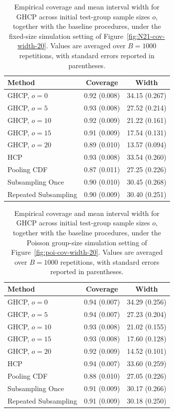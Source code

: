 
\begin{table}[t]
\centering
\caption{Empirical coverage and mean interval width for GHCP across initial test-group sample sizes $o$, together with the baseline procedures, under the fixed-size simulation setting of Figure~\ref{fig:N21-cov-width-20}. Values are averaged over $B=1000$ repetitions, with standard errors reported in parentheses.}
\label{tab:dhcp-hcp-alpha01-extra}
\small
\setlength{\tabcolsep}{6pt}
\begin{tabular}{lcc}
\toprule
Method & Coverage & Width \\
\midrule
GHCP, $o=0$  & 0.92 (0.008) & 34.15 (0.267) \\
GHCP, $o=5$  & 0.93 (0.008) & 27.52 (0.214) \\
GHCP, $o=10$  & 0.92 (0.009) & 21.22 (0.161) \\
GHCP, $o=15$  & 0.91 (0.009) & 17.54 (0.131) \\
GHCP, $o=20$  & 0.89 (0.010) & 13.57 (0.094) \\
HCP & 0.93 (0.008) & 33.54 (0.260) \\
Pooling CDF & 0.87 (0.011) & 27.25 (0.226) \\
Subsampling Once & 0.90 (0.010) & 30.45 (0.268) \\
Repeated Subsampling & 0.90 (0.009) & 30.40 (0.251) \\
\bottomrule
\end{tabular}
\end{table}

\begin{table}[t]
\centering
\caption{Empirical coverage and mean interval width for GHCP across initial test-group sample sizes $o$, together with the baseline procedures, under the Poisson group-size simulation setting of Figure~\ref{fig:poi-cov-width-20}. Values are averaged over $B=1000$ repetitions, with standard errors reported in parentheses.}
\label{tab:dhcp-hcp-poisson-alpha01-extra}
\small
\setlength{\tabcolsep}{6pt}
\begin{tabular}{lcc}
\toprule
Method & Coverage & Width \\
\midrule
GHCP, $o=0$  & 0.94 (0.007) & 34.29 (0.256) \\
GHCP, $o=5$  & 0.94 (0.007) & 27.23 (0.204) \\
GHCP, $o=10$  & 0.93 (0.008) & 21.02 (0.155) \\
GHCP, $o=15$  & 0.93 (0.008) & 17.60 (0.128) \\
GHCP, $o=20$  & 0.92 (0.009) & 14.52 (0.101) \\
HCP & 0.94 (0.007) & 33.60 (0.259) \\
Pooling CDF & 0.88 (0.010) & 27.05 (0.226) \\
Subsampling Once & 0.91 (0.009) & 30.17 (0.266) \\
Repeated Subsampling & 0.91 (0.009) & 30.18 (0.250) \\
\bottomrule
\end{tabular}
\end{table}
